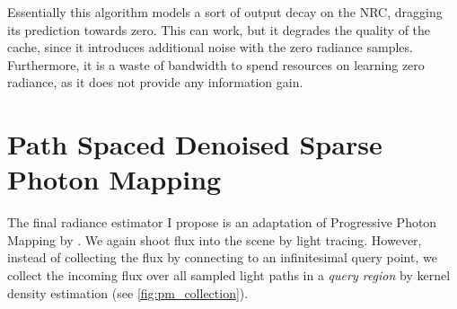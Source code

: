Essentially this algorithm models a sort of output decay on the NRC, dragging its prediction towards zero.
This can work, but it degrades the quality of the cache, since it introduces additional noise with the zero radiance samples.
Furthermore, it is a waste of bandwidth to spend resources on learning zero radiance, as it does not provide any information gain.

\section{Path Spaced Denoised Sparse Photon Mapping}
\label{sec:psdpm}
The final radiance estimator I propose is an adaptation of Progressive Photon Mapping by \textcite{jensen1996,hachisuka2008}.
We again shoot flux into the scene by light tracing.
However, instead of collecting the flux by connecting to an infinitesimal query point, we collect the incoming flux over all sampled light paths in a \emph{query region} by kernel density estimation (see \autoref{fig:pm_collection}).

